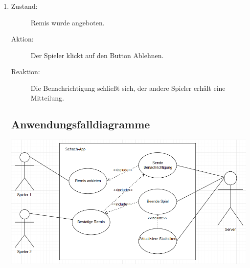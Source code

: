 \documentclass[parskip=full]{scrartcl}
\begin{document}
\begin{enumerate}
	\item
	\begin{description}
	\item[Zustand:] Remis wurde angeboten.
	\item[Aktion:] Der Spieler klickt auf den Button \glqq Ablehnen\grqq.
	\item[Reaktion:] Die Benachrichtigung schließt sich, der andere Spieler erhält eine Mitteilung.  \\
	\end{description}



\subsection{Anwendungsfalldiagramme} 
		\begin{minipage}{\linewidth}
			\centering
			\includegraphics[width=1\linewidth]{Remis}
			\label{fig:remis}
		\end{minipage}
\end{enumerate}

\glsaddall 
\printnoidxglossaries
\end{document}
